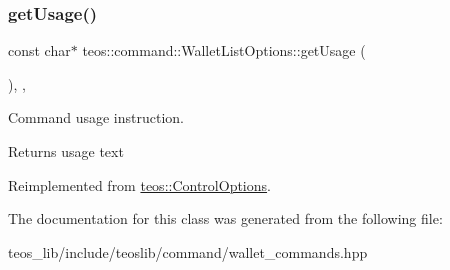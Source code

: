 \subsubsection{\texorpdfstring{get\+Usage()}{getUsage()}}
{\footnotesize\ttfamily const char$\ast$ teos\+::command\+::\+Wallet\+List\+Options\+::get\+Usage (\begin{DoxyParamCaption}{ }\end{DoxyParamCaption})\hspace{0.3cm}{\ttfamily [inline]}, {\ttfamily [protected]}, {\ttfamily [virtual]}}



Command \textquotesingle{}usage\textquotesingle{} instruction. 

\begin{DoxyReturn}{Returns}
usage text 
\end{DoxyReturn}


Reimplemented from \mbox{\hyperlink{classteos_1_1_control_options_a0aa5671f9bc750ed5280c26c543874f3}{teos\+::\+Control\+Options}}.



The documentation for this class was generated from the following file\+:\begin{DoxyCompactItemize}
\item 
teos\+\_\+lib/include/teoslib/command/wallet\+\_\+commands.\+hpp\end{DoxyCompactItemize}
